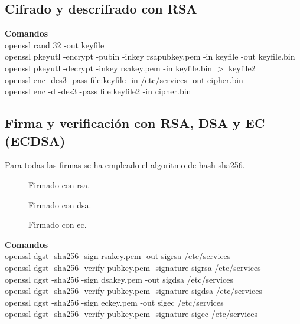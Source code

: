 \documentclass[11pt]{article}
\begin{document}
    \subsection{Cifrado y descrifrado con RSA}
      \par
      \textbf{Comandos}\\
      openssl rand 32 -out keyfile\\
      openssl pkeyutl -encrypt -pubin -inkey rsapubkey.pem -in keyfile -out keyfile.bin\\
      openssl pkeyutl -decrypt -inkey rsakey.pem -in keyfile.bin $>$ keyfile2\\
      openssl enc -des3 -pass file:keyfile -in /etc/services -out cipher.bin\\
      openssl enc -d -des3 -pass file:keyfile2 -in cipher.bin


    \subsection{Firma y verificación con RSA, DSA y EC (ECDSA)}
      \par
      Para todas las firmas se ha empleado el algoritmo de hash sha256.

      \begin{figure}[!ht]
        \centering
        \caption{Firmado con rsa.}
      \end{figure}

      \begin{figure}[!ht]
        \centering
        \caption{Firmado con dsa.}
      \end{figure}

      \begin{figure}[!ht]
        \centering
        \caption{Firmado con ec.}
      \end{figure}

      \par
      \textbf{Comandos}\\
      openssl dgst -sha256 -sign rsakey.pem -out sigrsa /etc/services\\
      openssl dgst -sha256 -verify pubkey.pem -signature sigrsa /etc/services\\
      \vspace{2mm}
      openssl dgst -sha256 -sign dsakey.pem -out sigdsa /etc/services\\
      openssl dgst -sha256 -verify pubkey.pem -signature sigdsa /etc/services\\
      \vspace{2mm}
      openssl dgst -sha256 -sign eckey.pem -out sigec /etc/services\\
      openssl dgst -sha256 -verify pubkey.pem -signature sigec /etc/services\\
\end{document}
